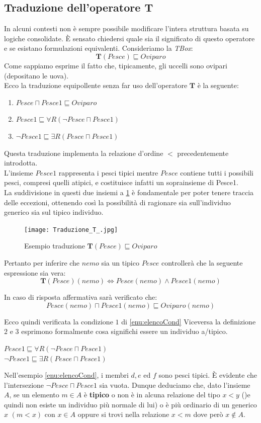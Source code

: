 \subsection{Traduzione dell'operatore T} \label{subSec: Traduzione T}
In alcuni contesti non è sempre possibile modificare l'intera struttura basata su logiche consolidate.
È sensato chiedersi quale sia il significato di questo operatore e se esistano formulazioni equivalenti.
Consideriamo la \textit{TBox}:
\[ \mathbf{T}(Pesce) \sqsubseteq Oviparo \]
Come sappiamo esprime il fatto che, tipicamente, gli uccelli sono ovipari (depositano le uova). \\
Ecco la traduzione equipollente senza far uso dell'operatore $ \mathbf{T} $ è la seguente: 
\begin{enumerate}\label{enu:elencoCond}
	\item $ Pesce \sqcap Pesce1 \sqsubseteq Oviparo $
	\item $ Pesce1 \sqsubseteq \forall R(\neg Pesce \sqcap Pesce1) $
	\item $ \neg Pesce1 \sqsubseteq \exists R(Pesce \sqcap Pesce1) $
\end{enumerate} 
Questa traduzione implementa la relazione d'ordine $ < $ precedentemente introdotta.\\
L'insieme $ Pesce1 $ rappresenta i pesci tipici mentre $ Pesce $ contiene tutti i possibili pesci, 
compresi quelli atipici, e costituisce infatti un soprainsieme di Pesce1. \\ 
La suddivisione in questi due insiemi a \ref{fig:tradPesce} è fondamentale per poter tenere traccia delle eccezioni, ottenendo così la possibilità di ragionare sia sull'individuo generico sia sul tipico individuo.\\
\begin{figure}[h]
	\texttt{[image: Traduzione\_T\_.jpg]}
	\centering
	\caption{Esempio traduzione $ \mathbf{T}(Pesce) \sqsubseteq Oviparo $}
	\label{fig:tradPesce}
\end{figure}
Pertanto per inferire che $ nemo $ sia un tipico $ Pesce $ controllerà che la seguente espressione sia vera:
\[ \mathbf{T}(Pesce)(nemo) \iff Pesce(nemo) \land Pesce1(nemo) \]

In caso di risposta affermativa sarà verificato che: 
\[ Pesce(nemo) \sqcap Pesce1(nemo) \sqsubseteq Oviparo(nemo) \]

Ecco quindi verificata la condizione $ 1 $ di \ref{enu:elencoCond}
Viceversa la definizione $ 2 \text{ e } 3 $ esprimono formalmente cosa significhi essere un individuo a/tipico.
\begin{multicols}{2}
	$ Pesce1 \sqsubseteq \forall R(\neg Pesce \sqcap Pesce1) $ \\
	$ \neg Pesce1 \sqsubseteq \exists R(Pesce \sqcap Pesce1) $
\end{multicols}
Nell'esempio \ref{enu:elencoCond}, i membri $ d,e \text{ ed } f $ sono pesci tipici. È evidente che l'intersezione
$ \neg Pesce \sqcap Pesce1 $ sia vuota. Dunque deduciamo che, dato l'insieme $ A $, se un elemento $ m \in A$ 
è \textbf{tipico} o non è in alcuna relazione del tipo $ x < y $ ()e quindi non esiste un 
individuo più normale di lui) o è più ordinario di un generico $ x $ $(m < x)$ con $ x \in A $ 
oppure si trovi nella relazione $ x < m $ dove però $ x \notin A $.

